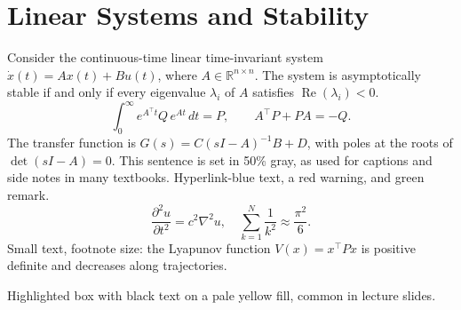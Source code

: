 \documentclass[11pt]{article}
\begin{document}
\section{Linear Systems and Stability}
Consider the continuous-time linear time-invariant system $\dot{x}(t) = A x(t) + B u(t)$, where $A \in \mathbb{R}^{n\times n}$.
The system is asymptotically stable if and only if every eigenvalue $\lambda_i$ of $A$ satisfies $\operatorname{Re}(\lambda_i) < 0$.
\begin{equation}
  \int_{0}^{\infty} e^{A^{\top} t} Q\, e^{A t}\, dt = P, \qquad A^{\top}P + PA = -Q .
\end{equation}
The transfer function is $G(s) = C(sI - A)^{-1}B + D$, with poles at the roots of $\det(sI-A)=0$.
{\color{gray} This sentence is set in 50\% gray, as used for captions and side notes in many textbooks.}
{\color{blue!70!black} Hyperlink-blue text}, {\color{red!75!black} a red warning}, and {\color[HTML]{1B7F3A} green remark}.
\begin{equation}
  \frac{\partial^2 u}{\partial t^2} = c^2 \nabla^2 u, \quad \sum_{k=1}^{N} \frac{1}{k^2} \approx \frac{\pi^2}{6}.
\end{equation}
{\small Small text, footnote size: the Lyapunov function $V(x)=x^{\top}Px$ is positive definite and decreases along trajectories.}
\par\noindent\colorbox{yellow!30}{Highlighted box with black text on a pale yellow fill, common in lecture slides.}
\end{document}
